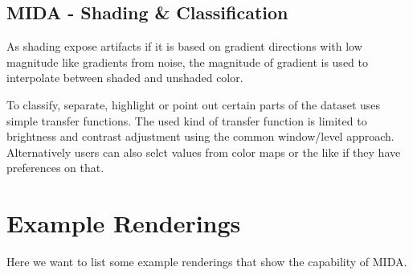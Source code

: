 \subsection{MIDA - Shading \& Classification}

As shading expose artifacts if it is based on gradient directions with low magnitude like gradients from noise, the magnitude of gradient is used to interpolate between shaded and unshaded color.

To classify, separate, highlight or point out certain parts of the dataset uses simple transfer functions.
The used kind of transfer function is limited to brightness and contrast adjustment using the common window/level approach.
Alternatively users can also selct values from color maps or the like if they have preferences on that.


\section{Example Renderings}

Here we want to list some example renderings that show the capability of MIDA.



